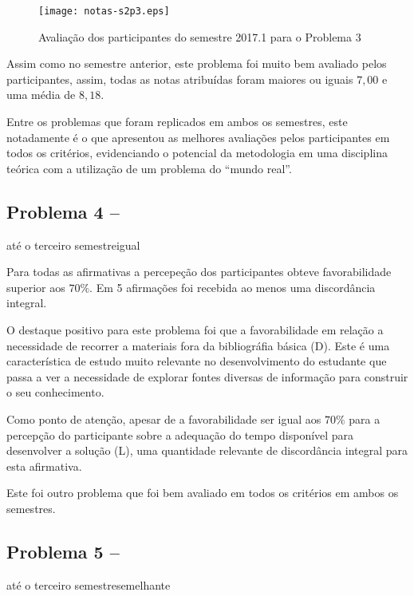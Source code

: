 \begin{figure}[!htb]
\centering
\texttt{[image: notas-s2p3.eps]}
\caption{Avaliação dos participantes do semestre 2017.1 para o Problema 3}
\label{aval-s2p3}
\end{figure}

Assim como no semestre anterior, este problema foi muito bem avaliado
pelos participantes, assim, todas as notas atribuídas foram maiores
ou iguais $7,00$ e uma média de $8,18$.

Entre os problemas que foram replicados em ambos os semestres, este
notadamente é o que apresentou as melhores avaliações pelos participantes
em todos os critérios, evidenciando o potencial da metodologia em uma
disciplina teórica com a utilização de um problema do ``mundo real''.

\subsection{Problema 4 -- \ProblemaD}
{até o terceiro semestre}{igual}

Para todas as afirmativas a percepeção dos participantes obteve favorabilidade
superior aos $70\%$. Em 5 afirmações foi recebida ao menos uma discordância
integral.

O destaque positivo para este problema foi que a favorabilidade em relação
a necessidade de recorrer a materiais fora da bibliográfia básica (D).
Este é uma característica de estudo muito relevante no desenvolvimento
do estudante que passa a ver a necessidade de explorar fontes diversas
de informação para construir o seu conhecimento.

Como ponto de atenção, apesar de a favorabilidade ser igual aos $70\%$ para
a percepção do participante sobre a adequação do tempo disponível para desenvolver
a solução (L), uma quantidade relevante de discordância integral para esta afirmativa.

Este foi outro problema que foi bem avaliado em todos os critérios em ambos
os semestres.

\subsection{Problema 5 -- \ProblemaE}
{até o terceiro semestre}{semelhante}

